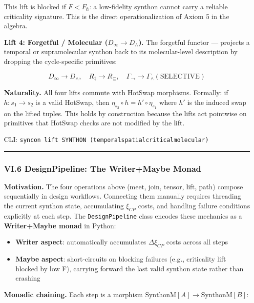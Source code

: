 \documentclass[12pt,a4paper]{article}
\begin{document}
This lift is blocked if $F < F_{\hbar}$: a low-fidelity synthon cannot carry a reliable criticality signature. This is the direct operationalization of Axiom 5 in the algebra.

\textbf{Lift 4: Forgetful / Molecular ($D_{\infty} \to D_{\wedge}$).} The forgetful functor --- projects a temporal or supramolecular synthon back to its molecular-level description by dropping the cycle-specific primitives:

\[D_{\infty} \to D_{\wedge}, \quad R_{\ddagger} \to R_{\subseteq}, \quad \Gamma_{\to} \to \Gamma_{\wedge}(\text{SELECTIVE})\]

\textbf{Naturality.} All four lifts commute with HotSwap morphisms. Formally: if $h: s_1 \to s_2$ is a valid HotSwap, then $\eta_{s_2} \circ h = h' \circ \eta_{s_1}$ where $h'$ is the induced swap on the lifted tuples. This holds by construction because the lifts act pointwise on primitives that HotSwap checks are not modified by the lift.

CLI: \texttt{syncon lift SYNTHON (temporal\textbar{}spatial\textbar{}critical\textbar{}molecular)}

\begin{center}
\rule{0.5\textwidth}{0.4pt}
\end{center}

\subsubsection{VI.6 DesignPipeline: The Writer+Maybe Monad}

\textbf{Motivation.} The four operations above (meet, join, tensor, lift, path) compose sequentially in design workflows. Connecting them manually requires threading the current synthon state, accumulating $\xi_{CP}$ costs, and handling failure conditions explicitly at each step. The \texttt{DesignPipeline} class encodes these mechanics as a \textbf{Writer+Maybe monad} in Python:

\begin{itemize}
    \item \textbf{Writer aspect}: automatically accumulates $\Delta\xi_{CP}$ costs across all steps
    \item \textbf{Maybe aspect}: short-circuits on blocking failures (e.g., criticality lift blocked by low F), carrying forward the last valid synthon state rather than crashing
\end{itemize}

\textbf{Monadic chaining.} Each step is a morphism $\text{SynthonM}[A] \to \text{SynthonM}[B]$:
\end{document}
